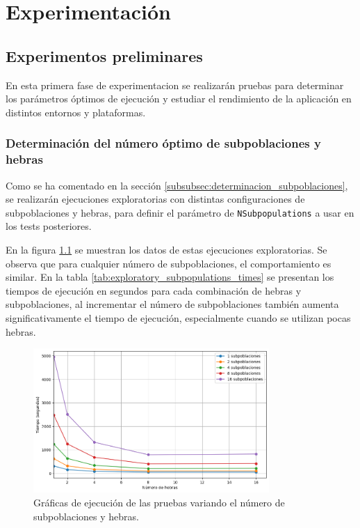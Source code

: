 \chapter{Experimentación}\label{cap:experimentacion}

\section{Experimentos preliminares}

En esta primera fase de experimentacion se realizarán pruebas para determinar los parámetros óptimos de ejecución y estudiar el rendimiento de la aplicación en distintos entornos y plataformas.

\subsection{Determinación del número óptimo de subpoblaciones y hebras}

Como se ha comentado en la sección \ref{subsubsec:determinacion_subpoblaciones}, se realizarán ejecuciones exploratorias con distintas configuraciones de subpoblaciones y hebras, para definir el parámetro de \texttt{NSubpopulations} a usar en los tests posteriores.

En la figura \ref{fig:exploratory_subpopulations} se muestran los datos de estas ejecuciones exploratorias. Se observa que para cualquier número de subpoblaciones, el comportamiento es similar. En la tabla \ref{tab:exploratory_subpopulations_times} se presentan los tiempos de ejecución en segundos para cada combinación de hebras y subpoblaciones, al incrementar el número de subpoblaciones también aumenta significativamente el tiempo de ejecución, especialmente cuando se utilizan pocas hebras.

\begin{figure}[ht]
    \centering
    \includegraphics[width=0.8\textwidth]{imagenes/cap5/exploratory_subpopulations.png}
    \caption{Gráficas de ejecución de las pruebas variando el número de subpoblaciones y hebras.}
    \label{fig:exploratory_subpopulations}
\end{figure}

